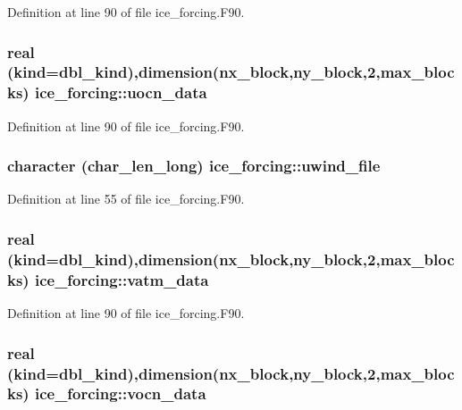 Definition at line 90 of file ice\_\-forcing.F90.\hypertarget{namespaceice__forcing_abf31afbe922f5e349590ae3e542e2116}{
\subsubsection[{uocn\_\-data}]{\setlength{\rightskip}{0pt plus 5cm}real (kind=dbl\_\-kind),dimension(nx\_\-block,ny\_\-block,2,max\_\-blocks) {\bf ice\_\-forcing::uocn\_\-data}}}
\label{namespaceice__forcing_abf31afbe922f5e349590ae3e542e2116}


Definition at line 90 of file ice\_\-forcing.F90.\hypertarget{namespaceice__forcing_a807421aa54b1f2f0416c158c1909b5bd}{
\subsubsection[{uwind\_\-file}]{\setlength{\rightskip}{0pt plus 5cm}character (char\_\-len\_\-long) {\bf ice\_\-forcing::uwind\_\-file}}}
\label{namespaceice__forcing_a807421aa54b1f2f0416c158c1909b5bd}


Definition at line 55 of file ice\_\-forcing.F90.\hypertarget{namespaceice__forcing_a369b83c4f0776d66c624871fbb32767d}{
\subsubsection[{vatm\_\-data}]{\setlength{\rightskip}{0pt plus 5cm}real (kind=dbl\_\-kind),dimension(nx\_\-block,ny\_\-block,2,max\_\-blocks) {\bf ice\_\-forcing::vatm\_\-data}}}
\label{namespaceice__forcing_a369b83c4f0776d66c624871fbb32767d}


Definition at line 90 of file ice\_\-forcing.F90.\hypertarget{namespaceice__forcing_af9f5d7d98f0d9a7a1754c8e066a5ecc7}{
\subsubsection[{vocn\_\-data}]{\setlength{\rightskip}{0pt plus 5cm}real (kind=dbl\_\-kind),dimension(nx\_\-block,ny\_\-block,2,max\_\-blocks) {\bf ice\_\-forcing::vocn\_\-data}}}
\label{namespaceice__forcing_af9f5d7d98f0d9a7a1754c8e066a5ecc7}


